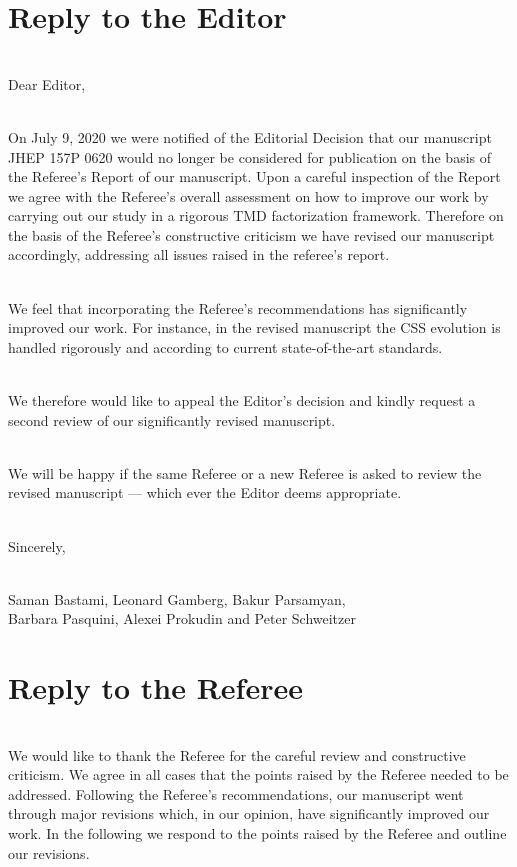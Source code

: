 \documentclass[a4paper]{article}
\begin{document}
 

\section*{Reply to the Editor}

\ \\
Dear Editor,

\ \\
On July 9, 2020 we were  notified of the Editorial Decision
that our manuscript JHEP 157P 0620 would no longer be
considered for publication on the basis of the Referee's Report of our manuscript.
Upon a careful inspection of the Report we agree 
with the Referee's overall assessment on how to
improve our work by carrying out our study in a rigorous TMD factorization framework.
Therefore on the basis of the Referee's constructive criticism 
we have revised our manuscript accordingly, addressing all issues raised 
in the referee's report.

\ \\
We feel that incorporating the Referee's recommendations 
has significantly improved our work. For instance, in the 
revised manuscript the CSS evolution is handled rigorously 
and according to current state-of-the-art standards.

\ \\
We therefore would like to appeal the Editor's decision and kindly request 
a second review of our significantly revised manuscript.

\ \\
We will be happy if the same Referee or a new Referee is asked to review 
the revised manuscript --- which ever the Editor deems appropriate.

\ \\
Sincerely,

\ \\
Saman Bastami, Leonard Gamberg, Bakur Parsamyan, \\
Barbara Pasquini, Alexei Prokudin and Peter Schweitzer

\newpage
\section*{Reply to the Referee}

\ \\
We would like to thank the Referee for the careful review
and constructive criticism. We agree in all cases that the 
points raised by the Referee needed to be addressed. Following
the Referee's recommendations, our manuscript went through 
major revisions which, in our opinion, have significantly improved 
our work. In the following we respond to the points raised by 
the Referee and outline our revisions.
\end{document}
